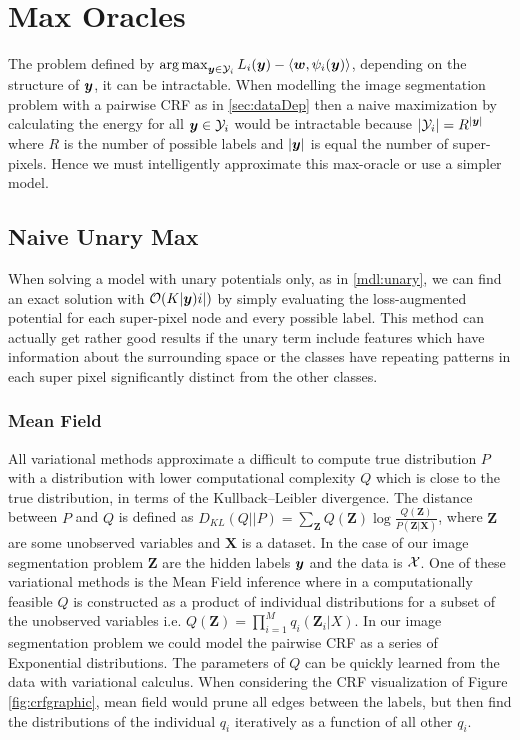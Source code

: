 \section{Max Oracles}
 The problem defined by  $ \operatorname*{arg\,max}_{\bm{y} \in \mathcal{Y}_i} L_i(\bm{y})-\langle \bm{w}, \psi_i(\bm{y}) \rangle $, depending on the structure of $\bm{y}$, it can be intractable. When modelling the image segmentation problem with a pairwise CRF as in \ref{sec:dataDep} then a naive maximization by calculating the energy for all $\bm{y} \in \mathcal{Y}_i$ would be intractable because $|\mathcal{Y}_i| = R^{|\bm{y}|}$ where $R$ is the number of possible labels and $|\bm{y}|$ is equal the number of super-pixels. Hence we must intelligently approximate this max-oracle or use a simpler model. 
\subsection{Naive Unary Max}\label{sec:unaryMax}
When solving a model with unary potentials only, as in \ref{mdl:unary}, we can find an exact solution with $\mathcal{O}(K|\bm{y})i|)$ by simply evaluating the loss-augmented potential for each super-pixel node and every possible label. This method can actually get rather good results if the unary term include features which have information about the surrounding space or the classes have repeating patterns in each super pixel significantly distinct from the other classes. 

\subsubsection{Mean Field }\label{sec:meanField}
All variational methods approximate a difficult to compute true distribution $P$ with a distribution with lower computational complexity $Q$ which is close to the true distribution, in terms of the Kullback–Leibler divergence. The distance between $P$ and $Q$ is defined as $D_{KL}(Q||P) = \sum_{\bm{Z}} Q(\bm{Z}) \log \frac{Q(\bm{Z})}{P(\bm{Z}|\bm{X})}$, where $\bm{Z} $ are some unobserved variables and $\bm{X}$ is a dataset. In the case of our image segmentation problem $\bm{Z}$ are the hidden labels $\bm{y}$ and the data is $\mathcal{X}$.
One of these variational methods is the Mean Field inference where in a computationally feasible $Q$ is constructed as a product of individual distributions for a subset of the unobserved variables i.e. $Q(\bm{Z}) = \prod_{i=1}^M q_i(\bm{Z}_i|X)$. In our image segmentation problem we could model the pairwise CRF as a series of Exponential distributions. The parameters of $Q$ can be quickly learned from the data with variational calculus. When considering the CRF visualization of Figure \ref{fig:crfgraphic}, mean field would prune all edges between the labels, but then find the distributions of the individual $q_i$ iteratively as a function of all other $q_i$.
